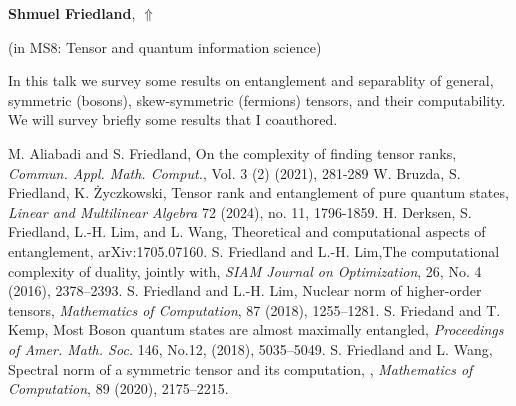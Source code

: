 \documentclass[ILAS2025-program.tex]{subfiles}
\begin{document}
\hypertarget{down0021}{}\begin{ilasabstract}
    
\textbf{Shmuel Friedland},  \hfill \hyperlink{up0021}{$\Uparrow$}
    
    
(in {\color{mstitle}MS8: Tensor and quantum information science})
        
\mtskip
    \begin{bibunit}
        In this talk we survey some results on entanglement and separablity of general, symmetric (bosons),  skew-symmetric (fermions) tensors, and their computability.  We will survey briefly some results that I coauthored.
\begin{thebibliography}{99}
 M. Aliabadi and S. Friedland, On the complexity of finding tensor ranks, \emph{Commun. Appl. Math. Comput.}, Vol. 3 (2) (2021),  281-289
 W. Bruzda, S. Friedland, K. {\.Z}yczkowski, Tensor rank and entanglement of pure quantum states,  {\it Linear and Multilinear Algebra} 72 (2024), no. 11, 1796-1859. 
  H. Derksen,  S. Friedland, L.-H. Lim, and L. Wang, Theoretical and computational aspects of entanglement,  arXiv:1705.07160.
 S. Friedland and  L.-H. Lim,The computational complexity of duality, jointly with,  \emph{SIAM Journal on Optimization}, 26, No. 4 (2016), 2378--2393.
 S. Friedland and  L.-H. Lim, Nuclear norm of higher-order tensors,  \emph{Mathematics of Computation}, 87 (2018), 1255--1281.
 S. Friedand and T. Kemp, Most Boson quantum states are almost maximally entangled,  \emph{Proceedings of Amer. Math. Soc.} 146, No.12, (2018), 5035--5049.
 S. Friedland and L. Wang, Spectral norm of a symmetric tensor and its computation, ,  \emph{Mathematics of Computation}, 89 (2020), 2175--2215.
\end{thebibliography}
        \end{bibunit}
        
\end{ilasabstract}
    
\end{document}

